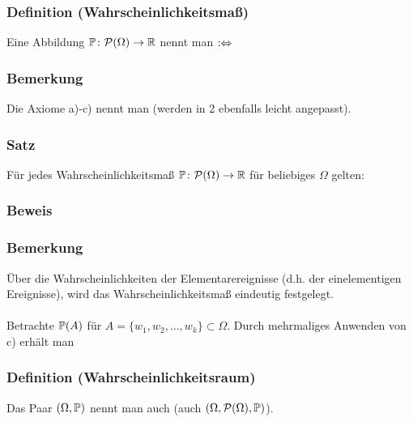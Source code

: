\subsubsection{Definition (Wahrscheinlichkeitsma\ss{})}
Eine Abbildung $\mathbb{P}\colon\mathcal{P}(\Omega)\to\mathbb{R}$ nennt man  $:\Leftrightarrow$
\subsubsection{Bemerkung}
Die Axiome a)-c) nennt man  (werden in 2 ebenfalls leicht angepasst).
\subsubsection{Satz}
F\"ur jedes Wahrscheinlichkeitsma\ss{} $\mathbb{P}\colon\mathcal{P}(\Omega)\to\mathbb{R}$ f\"ur beliebiges $\Omega$ gelten:
\subsubsection{Beweis}
\weg
\subsubsection{Bemerkung}
\"Uber die Wahrscheinlichkeiten der Elementarereignisse (d.h. der einelementigen Ereignisse), wird das Wahrscheinlichkeitsma\ss{} eindeutig festgelegt.
\\~\\
Betrachte $\mathbb{P}(A)$ f\"ur $A=\{w_1,w_2,\ldots,w_k\}\subset\Omega$. Durch mehrmaliges Anwenden von c) erh\"alt man
\subsubsection{Definition (Wahrscheinlichkeitsraum)}
Das Paar $(\Omega,\mathbb{P})$ nennt man auch  (auch $(\Omega,\mathcal{P}(\Omega),\mathbb{P})$).


